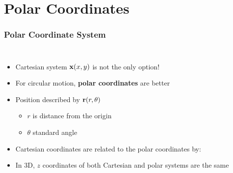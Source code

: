 \documentclass[12pt,compress,aspectratio=169]{beamer}
\newcommand{\mb}[1]{\ensuremath\mathbf{#1}}
\begin{document}
\section{Polar Coordinates}
\begin{frame}
  \frametitle{Polar Coordinate System}
  \begin{columns}
    \begin{itemize}
    \item Cartesian system $\mb{x}(x,y)$ is not the only option!
    \item For circular motion, \textbf{polar coordinates} are better
    \item Position described by $\mb{r}(r,\theta)$
      \begin{itemize}
      \item $r$ is distance from the origin
      \item $\theta$ standard angle
      \end{itemize}
    \item Cartesian coordinates are related to the polar coordinates by:

      \vspace{-0.45in}{\large
        \begin{align*}
          x&=r\cos\theta\\
          y&=r\sin\theta
        \end{align*}
      }
    \item In 3D, $z$ coordinates of both Cartesian and polar systems
      are the same
    \end{itemize}
  \end{columns}
\end{frame}
\end{document}
